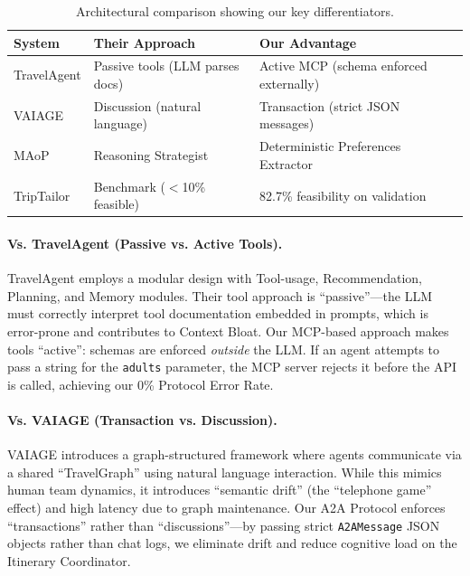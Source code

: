 \documentclass[conference]{IEEEtran}
\begin{document}
\begin{table}[h]
\centering
\small
\begin{tabular}{p{1.6cm}p{2.3cm}p{2.6cm}}
\toprule
\textbf{System} & \textbf{Their Approach} & \textbf{Our Advantage} \\
\midrule
TravelAgent & Passive tools (LLM parses docs) & Active MCP (schema enforced externally) \\
VAIAGE & Discussion (natural language) & Transaction (strict JSON messages) \\
MAoP & Reasoning Strategist & Deterministic Preferences Extractor \\
TripTailor & Benchmark ($<$10\% feasible) & 82.7\% feasibility on validation \\
\bottomrule
\end{tabular}
\caption{Architectural comparison showing our key differentiators.}
\label{tab:arch_comparison}
\end{table}

\paragraph{Vs. TravelAgent (Passive vs. Active Tools).}
TravelAgent \cite{chen2024travelagent} employs a modular design with Tool-usage, Recommendation, Planning, and Memory modules. Their tool approach is ``passive''---the LLM must correctly interpret tool documentation embedded in prompts, which is error-prone and contributes to Context Bloat. Our MCP-based approach makes tools ``active'': schemas are enforced \textit{outside} the LLM. If an agent attempts to pass a string for the \texttt{adults} parameter, the MCP server rejects it before the API is called, achieving our 0\% Protocol Error Rate.

\paragraph{Vs. VAIAGE (Transaction vs. Discussion).}
VAIAGE \cite{ge2025vaiage} introduces a graph-structured framework where agents communicate via a shared ``TravelGraph'' using natural language interaction. While this mimics human team dynamics, it introduces ``semantic drift'' (the ``telephone game'' effect) and high latency due to graph maintenance. Our A2A Protocol enforces ``transactions'' rather than ``discussions''---by passing strict \texttt{A2AMessage} JSON objects rather than chat logs, we eliminate drift and reduce cognitive load on the Itinerary Coordinator.
\end{document}
